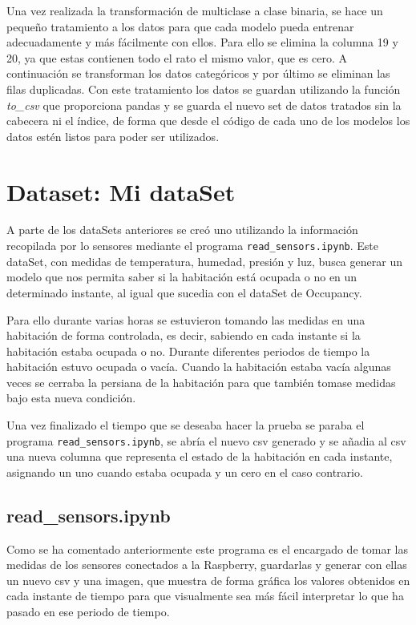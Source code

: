 \documentclass[a4paper, 12pt]{book}
\begin{document}
Una vez realizada la transformación de multiclase a clase binaria, se hace un pequeño tratamiento a los datos para que cada modelo pueda entrenar adecuadamente y más fácilmente con ellos\cite{dataSetTreatment}. Para ello se elimina la columna 19 y 20, ya que estas contienen todo el rato el mismo valor, que es cero. A continuación se transforman los datos categóricos y por último se eliminan las filas duplicadas. Con este tratamiento los datos se guardan utilizando la función \textit{to\_csv} que proporciona pandas y se guarda el nuevo set de datos tratados sin la cabecera ni el índice, de forma que desde el código de cada uno de los modelos los datos estén listos para poder ser utilizados.

\section{Dataset: Mi dataSet}
\label{sec:mi_dataSet}

A parte de los dataSets anteriores se creó uno utilizando la información recopilada por lo sensores mediante el programa \texttt{read\_sensors.ipynb}. Este dataSet, con medidas de temperatura, humedad, presión y luz, busca generar un modelo que nos permita saber si la habitación está ocupada o no en un determinado instante, al igual que sucedia con el dataSet de Occupancy. 

Para ello durante varias horas se estuvieron tomando las medidas en una habitación de forma controlada, es decir, sabiendo en cada instante si la habitación estaba ocupada o no. Durante diferentes periodos de tiempo la habitación estuvo ocupada o vacía. Cuando la habitación estaba vacía algunas veces se cerraba la persiana de la habitación para que también tomase medidas bajo esta nueva condición.

Una vez finalizado el tiempo que se deseaba hacer la prueba se paraba el programa \texttt{read\_sensors.ipynb}, se abría el nuevo csv generado y se añadia al csv una nueva columna que representa el estado de la habitación en cada instante, asignando un uno cuando estaba ocupada y un cero en el caso contrario.

\subsection{read\_sensors.ipynb}
\label{subsec_read_sensors}

Como se ha comentado anteriormente este programa es el encargado de tomar las medidas de los sensores conectados a la Raspberry, guardarlas y generar con ellas un nuevo csv y una imagen, que muestra de forma gráfica los valores obtenidos en cada instante de tiempo para que visualmente sea más fácil interpretar lo que ha pasado en ese periodo de tiempo. 
\end{document}
